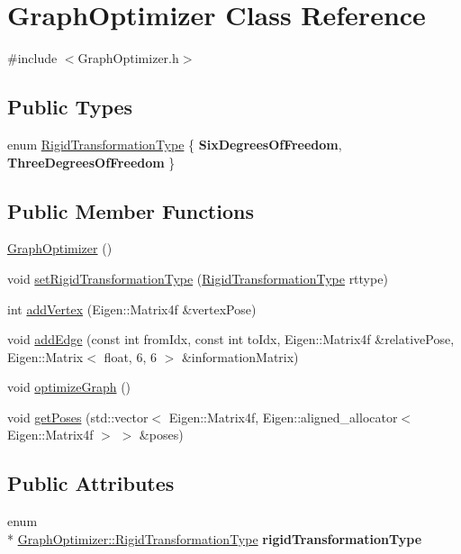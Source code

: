 \hypertarget{classGraphOptimizer}{\section{Graph\-Optimizer Class Reference}
\label{classGraphOptimizer}
}


{\ttfamily \#include $<$Graph\-Optimizer.\-h$>$}

\subsection*{Public Types}
\begin{DoxyCompactItemize}
\item 
enum \hyperlink{classGraphOptimizer_a21a8d2f42bd9f16a4392165b2f870519}{Rigid\-Transformation\-Type} \{ {\bfseries Six\-Degrees\-Of\-Freedom}, 
{\bfseries Three\-Degrees\-Of\-Freedom}
 \}
\end{DoxyCompactItemize}
\subsection*{Public Member Functions}
\begin{DoxyCompactItemize}
\item 
\hyperlink{classGraphOptimizer_ae83e656c0388055d7a1ee93daf23b6f6}{Graph\-Optimizer} ()
\item 
void \hyperlink{classGraphOptimizer_abfc62d26e775bee508b43809b9a617d5}{set\-Rigid\-Transformation\-Type} (\hyperlink{classGraphOptimizer_a21a8d2f42bd9f16a4392165b2f870519}{Rigid\-Transformation\-Type} rttype)
\item 
int \hyperlink{classGraphOptimizer_a5d8a637a588269b2d99b4566129f2fde}{add\-Vertex} (Eigen\-::\-Matrix4f \&vertex\-Pose)
\item 
void \hyperlink{classGraphOptimizer_a520bc5a1539437c37d773e19318e3431}{add\-Edge} (const int from\-Idx, const int to\-Idx, Eigen\-::\-Matrix4f \&relative\-Pose, Eigen\-::\-Matrix$<$ float, 6, 6 $>$ \&information\-Matrix)
\item 
void \hyperlink{classGraphOptimizer_a2294fd5b0130f1550e32eb27fc508ef1}{optimize\-Graph} ()
\item 
void \hyperlink{classGraphOptimizer_a07f04695bef0b9b922c6be0fb10e0dab}{get\-Poses} (std\-::vector$<$ Eigen\-::\-Matrix4f, Eigen\-::aligned\-\_\-allocator$<$ Eigen\-::\-Matrix4f $>$ $>$ \&poses)
\end{DoxyCompactItemize}
\subsection*{Public Attributes}
\begin{DoxyCompactItemize}
\item 
\hypertarget{classGraphOptimizer_aae75c992b3137f3c9c887e77d644531d}{enum \\*
\hyperlink{classGraphOptimizer_a21a8d2f42bd9f16a4392165b2f870519}{Graph\-Optimizer\-::\-Rigid\-Transformation\-Type} {\bfseries rigid\-Transformation\-Type}}\label{classGraphOptimizer_aae75c992b3137f3c9c887e77d644531d}

\end{DoxyCompactItemize}
